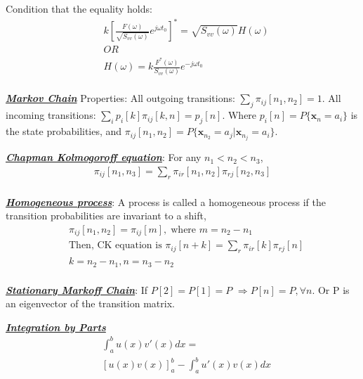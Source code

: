 \documentclass[12pt]{article}
\newcommand{\bulletPoint}[1]{\ul{\textit{\textbf{#1}}}}
\begin{document}
\begin{multicols*}{4}
Condition that the equality holds:
\useshortskip \begin{equation*}
    \begin{split}
& k\left[ \frac{F(\omega)}{\sqrt{S_{vv}(\omega)}}e^{j\omega t_0} \right]^* = \sqrt{S_{vv}(\omega)}H(\omega) \\
&OR\\[-5pt]
& H(\omega) = k\frac{F^*(\omega)}{S_{vv}(\omega)}e^{-j\omega t_0}\\[-5pt]
\end{split}
\end{equation*}


\bulletPoint{Markov Chain}
Properties: All outgoing transitions: $\sum_j \pi_{ij} [n_1, n_2]=1$. All incoming transitions: $\sum_i p_i[k]\pi_{ij}[k,n]=p_j[n]$. Where $p_i[n] = P\{\mathbf{x}_n=a_i\}$ is the state probabilities, and $\pi_{ij}[n_1,n_2] = P\{\mathbf{x}_{n_2}=a_j|\mathbf{x}_{n_j}=a_i\}$.


\bulletPoint{Chapman Kolmogoroff equation}: For any $n_1<n_2<n_3$,
\useshortskip \begin{equation*}
    \begin{split}
        \pi_{ij}[n_1, n_3] = \sum_r \pi_{ir}[n_1,n_2]\pi_{rj}[n_2,n_3]\\[-8pt]
    \end{split}
\end{equation*}


\bulletPoint{Homogeneous process}: A process is called a homogeneous process if the transition probabilities are invariant to a shift,
\useshortskip \begin{equation*}
    \begin{split}
        & \pi_{ij}[n_1,n_2]=\pi_{ij}[m], \; \text{where } m=n_2-n_1\\
        & \text{Then, CK equation is }\pi_{ij}[n+k] = \sum_r\pi_{ir}[k]\pi_{rj}[n]\\[-7pt]
        & k=n_2-n_1, n=n_3-n_2\\[-7pt]
    \end{split}
\end{equation*}


\bulletPoint{Stationary Markoff Chain}: If $P[2]=P[1]=P$ $\Longrightarrow P[n]=P, \forall n$. Or P is an eigenvector of the transition matrix. 


\bulletPoint{Integration by Parts}
\useshortskip \begin{equation*}
\begin{split}
        & \int^b_a u(x) v'(x)dx = \\[-5pt]
        & [u(x)v(x)]^b_a - \int^b_a u'(x) v(x) dx
\end{split}
\end{equation*}


\end{multicols*}
\end{document}
